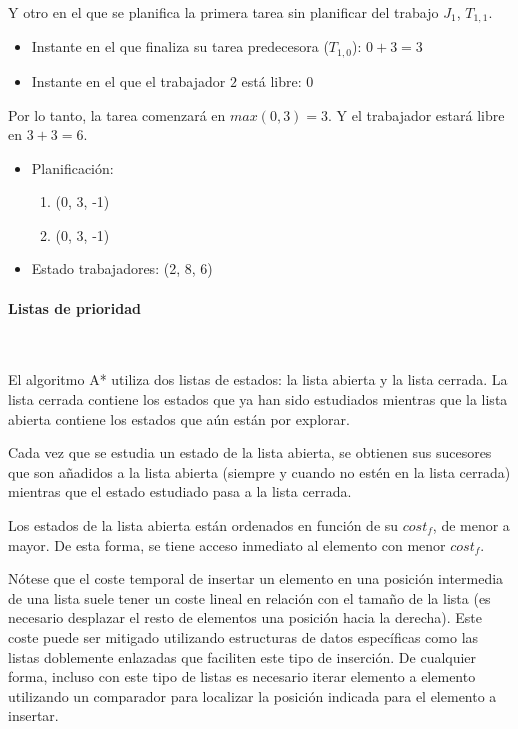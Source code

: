 \begin{examplebox}
    Y otro en el que se planifica la primera tarea sin planificar del trabajo $J_1$, $T_{1,1}$.
    \begin{itemize}[itemsep=0.25px]
        \item Instante en el que finaliza su tarea predecesora ($T_{1,0}$): $0 + 3 = 3$
        \item Instante en el que el trabajador $2$ está libre: $0$
    \end{itemize}
    Por lo tanto, la tarea comenzará en $max(0, 3) = 3$.
    Y el trabajador estará libre en $3 + 3 = 6$.
    \begin{itemize}[itemsep=0.25px]
        \item Planificación:
        \begin{enumerate}[start=0, itemsep=0.25px]
            \item (0, 3, -1)
            \item (0, 3, -1)
        \end{enumerate}
        \item Estado trabajadores: (2, 8, 6)
    \end{itemize}
\end{examplebox}

\paragraph{Listas de prioridad}~

El algoritmo A* utiliza dos listas de estados: la lista abierta y la lista cerrada.
La lista cerrada contiene los estados que ya han sido estudiados mientras que
la lista abierta contiene los estados que aún están por explorar.

Cada vez que se estudia un estado de la lista abierta,
se obtienen sus sucesores que son añadidos a la lista abierta
(siempre y cuando no estén en la lista cerrada)
mientras que el estado estudiado pasa a la lista cerrada.

Los estados de la lista abierta están ordenados en función de su $cost_f$,
de menor a mayor.
De esta forma, se tiene acceso inmediato al elemento con menor $cost_f$.

Nótese que el coste temporal de insertar un elemento en una posición intermedia
de una lista suele tener un coste lineal en relación con el tamaño de la lista
(es necesario desplazar el resto de elementos una posición hacia la derecha).
Este coste puede ser mitigado utilizando estructuras de datos específicas
como las listas doblemente enlazadas que faciliten este tipo de inserción.
De cualquier forma, incluso con este tipo de listas es necesario
iterar elemento a elemento utilizando un comparador para localizar
la posición indicada para el elemento a insertar.

